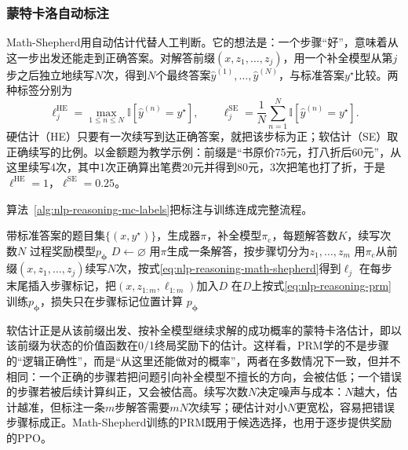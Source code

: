 \subsubsection{蒙特卡洛自动标注}
\label{sec:nlp-reasoning-prm-mc}

Math-Shepherd用自动估计代替人工判断。它的想法是：一个步骤“好”，意味着从这一步出发还能走到正确答案。对解答前缀$(x,z_1,\ldots,z_j)$，用一个补全模型从第$j$步之后独立地续写$N$次，得到$N$个最终答案$\hat y^{(1)},\ldots,\hat y^{(N)}$，与标准答案$y^\star$比较。两种标签分别为
\begin{equation}
  \ell_j^{\mathrm{HE}}=\max_{1\le n\le N}\mathbb I[\hat y^{(n)}=y^\star],\qquad
  \ell_j^{\mathrm{SE}}=\frac1N\sum_{n=1}^{N}\mathbb I[\hat y^{(n)}=y^\star].
  \label{eq:nlp-reasoning-math-shepherd}
\end{equation}
硬估计（HE）只要有一次续写到达正确答案，就把该步标为正；软估计（SE）取正确续写的比例。以金额题为教学示例：前缀是“书原价75元，打八折后60元”，从这里续写4次，其中1次正确算出笔费20元并得到80元，3次把笔也打了折，于是$\ell^{\mathrm{HE}}=1$，$\ell^{\mathrm{SE}}=0.25$。

算法~\ref{alg:nlp-reasoning-mc-labels}把标注与训练连成完整流程。

\begin{algorithm}[蒙特卡洛过程标注与PRM训练]
  \label{alg:nlp-reasoning-mc-labels}
  \begin{algorithmic}[1]
    \Require 带标准答案的题目集$\{(x,y^\star)\}$，生成器$\pi$，补全模型$\pi_{\mathrm c}$，每题解答数$K$，续写次数$N$
    \Ensure 过程奖励模型$p_{\bm\phi}$
    \State $D\gets\varnothing$
        \State 用$\pi$生成一条解答，按步骤切分为$z_1,\ldots,z_m$
          \State 用$\pi_{\mathrm c}$从前缀$(x,z_1,\ldots,z_j)$续写$N$次，按式\eqref{eq:nlp-reasoning-math-shepherd}得到$\ell_j$
        \EndFor
        \State 在每步末尾插入步骤标记，把$(x,z_{1:m},\ell_{1:m})$加入$D$
      \EndFor
    \EndFor
    \State 在$D$上按式\eqref{eq:nlp-reasoning-prm}训练$p_{\bm\phi}$，损失只在步骤标记位置计算
    \State \Return $p_{\bm\phi}$
  \end{algorithmic}
\end{algorithm}

软估计正是从该前缀出发、按补全模型继续求解的成功概率的蒙特卡洛估计，即以该前缀为状态的价值函数在0/1终局奖励下的估计。这样看，PRM学的不是步骤的“逻辑正确性”，而是“从这里还能做对的概率”，两者在多数情况下一致，但并不相同：一个正确的步骤若把问题引向补全模型不擅长的方向，会被估低；一个错误的步骤若被后续计算纠正，又会被估高。续写次数$N$决定噪声与成本：$N$越大，估计越准，但标注一条$m$步解答需要$mN$次续写；硬估计对小$N$更宽松，容易把错误步骤标成正。Math-Shepherd训练的PRM既用于候选选择，也用于逐步提供奖励的PPO。


